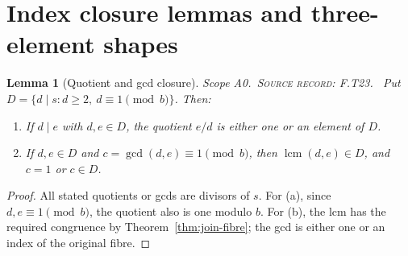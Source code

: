 \documentclass[11pt,oneside,openany]{book}
\newtheorem{lemma}[theorem]{Lemma}
\theoremstyle{definition}
\theoremstyle{remark}
\newcommand{\lcmop}{\operatorname{lcm}}
\newcommand{\gcdop}{\operatorname{gcd}}
\newcommand{\scope}[1]{\textsf{\small Scope #1.}\ }
\newcommand{\record}[1]{\textup{\textsc{Source record: #1.}}\ }
\begin{document}
\section{Index closure lemmas and three-element shapes}
\begin{lemma}[Quotient and gcd closure]\label{lem:shape-closure}
\scope{A0}\record{F.T23} Put \(D=\{d\mid s:d\ge2,\ d\equiv1\pmod b\}\). Then:
\begin{enumerate}[label=(\alph*)]
\item If \(d\mid e\) with \(d,e\in D\), the quotient \(e/d\) is either one or an element of \(D\).
\item If \(d,e\in D\) and \(c=\gcdop(d,e)\equiv1\pmod b\), then \(\lcmop(d,e)\in D\), and \(c=1\) or \(c\in D\).
\end{enumerate}
\end{lemma}
\begin{proof}
All stated quotients or gcds are divisors of \(s\). For (a), since \(d,e\equiv1\pmod b\), the quotient also is one modulo \(b\). For (b), the lcm has the required congruence by Theorem~\ref{thm:join-fibre}; the gcd is either one or an index of the original fibre.
\end{proof}
\end{document}
